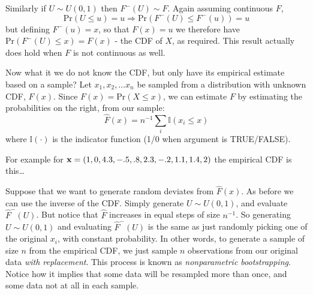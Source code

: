 \documentclass[10pt] {article}
\newcommand{\eps}[3]
{{\begin{center}
 \rotatebox{#1}{\scalebox{#2}{\texttt{[image: \#3]}}}
 \end{center}}
}
\theoremstyle{definition}
\begin{document}
Similarly if $U \sim U(0,1)$ then $F^-(U) \sim F$. Again assuming continuous $F$, 
$$
\text{Pr}(U\le u) = u \Rightarrow \text{Pr}(F^-(U)\le F^-(u)) = u 
$$
but defining $F^-(u) = x$, so that $F(x)=u$ we therefore have $\text{Pr}(F^-(U)\le x) = F(x)$ - the CDF of $X$, as required. This result actually does hold when $F$ is not continuous as well. 

Now what it we do not know the CDF, but only have its empirical estimate based on a sample? Let $x_1, x_2, \ldots x_n$ be sampled from a distribution with unknown CDF, $F(x)$. Since $F(x) = \text{Pr}(X \le x)$, we can estimate $F$ by estimating the probabilities on the right, from our sample:
$$
\hat F(x) = n^{-1} \sum_i \mathbb{I}(x_i\le x)
$$
where $\mathbb{I}(\cdot)$ is the indicator function (1/0 when argument is TRUE/FALSE). 

For example for  ${\bf x} = (1, 0, 4.3, -.5, .8, 2.3, -.2, 1.1, 1.4, 2)$ the empirical CDF is this\ldots

\eps{-90}{.5}{ecdf-bs.eps}

Suppose that we want to generate random deviates from $ \hat F(x) $. As before we can use the inverse of the CDF. Simply generate $U \sim U(0,1)$, and evaluate $ \hat F^-(U) $. But notice that $\hat F$ increases in equal steps of size $n^{-1}$. So generating $U \sim U(0,1)$ and evaluating $ \hat F^-(U) $ is the same as just randomly picking one of the original $x_i$, with constant probability. In other words, to generate a sample of size $n$ from the empirical CDF, we just sample $n$ observations from our original data {\em with replacement}. This process is known as {\em nonparametric bootstrapping}. Notice how it implies that some data will be resampled more than once, and some data not at all in each sample. 
\end{document}
